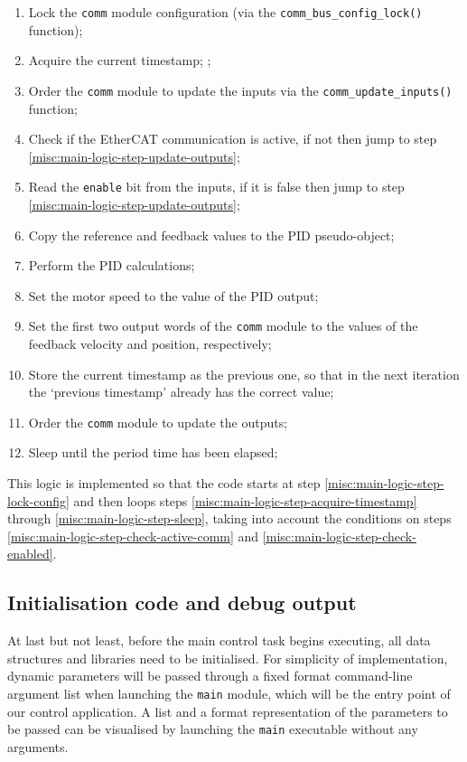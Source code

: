 \begin{enumerate}
	\item Lock the \verb|comm| module configuration (via the \lstinline[columns=fixed]{comm_bus_config_lock()} function); \label{misc:main-logic-step-lock-config}
	\item Acquire the current timestamp; \label{misc:main-logic-step-acquire-timestamp};
	\item Order the \verb|comm| module to update the inputs via the \lstinline[columns=fixed]{comm_update_inputs()} function;
	\item Check if the EtherCAT communication is active, if not then jump to step \ref{misc:main-logic-step-update-outputs}; \label{misc:main-logic-step-check-active-comm}
	\item Read the \verb|enable| bit from the inputs, if it is false then jump to step \ref{misc:main-logic-step-update-outputs}; \label{misc:main-logic-step-check-enabled}
	\item Copy the reference and feedback values to the PID pseudo-object;
	\item Perform the PID calculations;
	\item Set the motor speed to the value of the PID output;
	\item Set the first two output words of the \verb|comm| module to the values of the feedback velocity and position, respectively; \label{misc:main-logic-step-update-outputs}
	\item Store the current timestamp as the previous one, so that in the next iteration the `previous timestamp' already has the correct value;
	\item Order the \verb|comm| module to update the outputs;
	\item Sleep until the period time has been elapsed; \label{misc:main-logic-step-sleep}
\end{enumerate}

This logic is implemented so that the code starts at step \ref{misc:main-logic-step-lock-config} and then loops steps \ref{misc:main-logic-step-acquire-timestamp} through \ref{misc:main-logic-step-sleep}, taking into account the conditions on steps \ref{misc:main-logic-step-check-active-comm} and \ref{misc:main-logic-step-check-enabled}.

\subsection{Initialisation code and debug output}
At last but not least, before the main control task begins executing, all data structures and libraries need to be initialised.
For simplicity of implementation, dynamic parameters will be passed through a fixed format command-line argument list when launching the \verb|main| module, which will be the entry point of our control application.
A list and a format representation of the parameters to be passed can be visualised by launching the \verb|main| executable without any arguments.


